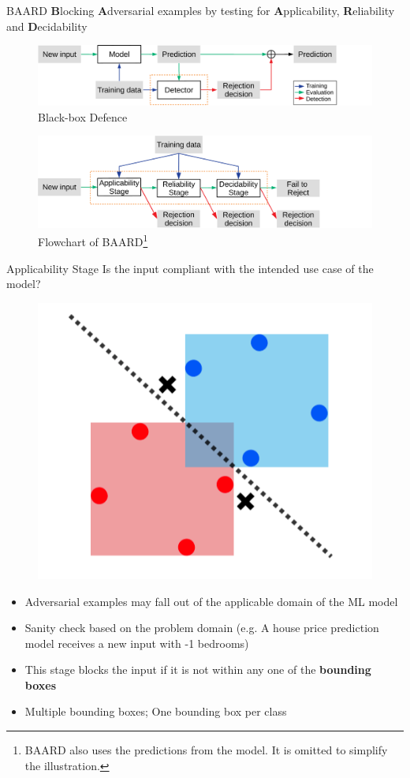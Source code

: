 \documentclass[9pt]{beamer}
\begin{document}
\begin{frame}{BAARD}
\textbf{B}locking \textbf{A}dversarial examples by testing for \textbf{A}pplicability, \textbf{R}eliability and \textbf{D}ecidability

\begin{figure}[h!]
    \centering
    \scriptsize
    \includegraphics[width=0.85\linewidth]{images/black-box-defence_2.pdf}
    \caption{Black-box Defence}
\end{figure}

\begin{figure}
    \centering
    \scriptsize
    \includegraphics[width=0.85\linewidth]{images/baard_2.pdf}
    \caption{Flowchart of BAARD\footnote{BAARD also uses the predictions from the model. It is omitted to simplify the illustration.}}
\end{figure}
\end{frame}

\begin{frame}{Applicability Stage}
Is the input compliant with the intended use case of the model?
\begin{figure}
    \centering
    \includegraphics[width=0.35\linewidth]{images/applicability.png}
\end{figure}

\begin{itemize}
    \item Adversarial examples may fall out of the applicable domain of the ML model
    \item Sanity check based on the problem domain (e.g. A house price prediction model receives a new input with -1 bedrooms)
    \item This stage blocks the input if it is not within any one of the \textbf{bounding boxes}
    \item Multiple bounding boxes; One bounding box per class
\end{itemize}

\end{frame}
\end{document}
